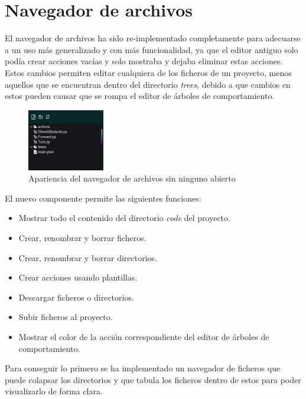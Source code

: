 \section{Navegador de archivos}

El navegador de archivos ha sido re-implementado completamente para adecuarse a un uso más generalizado y con más funcionalidad, ya que el editor antiguo solo podía crear acciones vacías y solo mostraba y dejaba eliminar estas acciones. Estos cambios permiten editar cualquiera de los ficheros de un proyecto, menos aquellos que se encuentran dentro del directorio \textit{trees}, debido a que cambios en estos pueden causar que se rompa el editor de árboles de comportamiento.

\begin{figure}[H]
    \centering
    \includegraphics[width=0.3\textwidth]{figures/bt-avances/nav.png}
    \caption{Apariencia del navegador de archivos sin ninguno abierto}
    \label{fig:nav-close}
\end{figure}

El nuevo componente permite las siguientes funciones:

\begin{itemize}
    \item Mostrar todo el contenido del directorio \textit{code} del proyecto.
    \item Crear, renombrar y borrar ficheros.
    \item Crear, renombrar y borrar directorios.
    \item Crear acciones usando plantillas.
    \item Descargar ficheros o directorios.
    \item Subir ficheros al proyecto.
    \item Mostrar el color de la acción correspondiente del editor de árboles de comportamiento.
\end{itemize}

Para conseguir lo primero se ha implementado un navegador de ficheros que puede colapsar los directorios y que tabula los ficheros dentro de estos para poder visualizarlo de forma clara.


